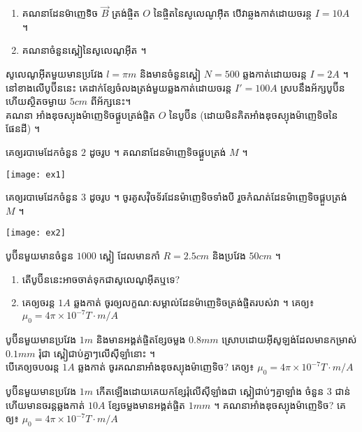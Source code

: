 \documentclass[12pt, a4paper]{article}
\begin{document}
\begin{enumerate}[m]
\begin{minipage}{0.60\textwidth}
	\begin{enumerate}[k]
		\item គណនាដែនម៉ាញេទិច $\vec{B}$ ត្រង់ផ្ចិត $O$ នៃផ្ចិតនៃសូលេណូអ៊ីត បើវាឆ្លងកាត់ដោយចរន្ត $I=10A$ ។
		\item គណនាចំនួនស្ពៀនៃសូលេណូអ៊ីត ។
	\end{enumerate}
	\end{minipage}
	\item សូលេណូអ៊ីតមួយមានប្រវែង $l=\pi m$ និងមានចំនួនស្ពៀ $N=500$ ឆ្លងកាត់ដោយចរន្ត $I=2A$ ។ នៅខាងលើបូប៊ីននេះ គេដាក់ខ្សែចំលងត្រង់មួយឆ្លងកាត់ដោយចរន្ត $I'=100A$ ស្របនឹងអ័ក្សបូប៊ីន ហើយស្ថិតចម្ងាយ $5cm$ ពីអ័ក្សនេះ។ \\
	គណនា អាំងឌុចស្យុងម៉ាញេទិចផ្គួបត្រង់ផ្ចិត $O$ នៃបូប៊ីន (ដោយមិនគិតអាំងឌុចស្យុងម៉ាញេទិចនៃផែនដី) ។\\
	\begin{minipage}{0.60\textwidth}
		\item គេឲ្យរបាមេដែកចំនួន $2$ ដូចរូប ។ គណនាដែនម៉ាញេទិចផ្គួបត្រង់
		$M$ ។
	\end{minipage}
	\begin{minipage}{0.40\textwidth}
		\texttt{[image: ex1]}
	\end{minipage}
	\begin{minipage}{0.60\textwidth}
		\item គេឲ្យរបាមេដែកចំនួន $3$ ដូចរូប ។ ចូរគូសវ៉ិចទ័រដែនម៉ាញេទិចទាំងបី រួចកំណត់ដែនម៉ាញេទិចផ្គួបត្រង់
		$M$ ។
	\end{minipage}
	\begin{minipage}{0.40\textwidth}
		\texttt{[image: ex2]}
	\end{minipage}
	\item បូប៊ីនមួយមានចំនួន $1000$ ស្ពៀ ដែលមានកាំ $R=2.5cm$ និងប្រវែង $50cm$ ។
	\begin{enumerate}[k]
		\item តើបូប៊ីននេះអាចចាត់ទុកជាសូលេណូអ៊ីតឬទេ?
		\item គេឲ្យចរន្ត $1A$ ឆ្លងកាត់ ចូរឲ្យលក្ខណៈសម្គាល់ដែនម៉ាញេទិចត្រង់ផ្ចិតរបស់វា ។ គេឲ្យ៖ $\mu_0=4\pi\times10^{-7}T\cdot m/A$
	\end{enumerate}
	\item បូប៊ីនមួយមានប្រវែង $1m$ និងមានអង្គត់ផ្ចិតខ្សែចម្លង $0.8mm$ ស្រោបដោយអ៊ីសូឡង់ដែលមានកម្រាស់ $0.1mm$ រុំជា ស្ពៀជាប់គ្នាៗលើស៊ីឡាំនោះ ។\\
	បើគេឲ្យចបឲរន្ត $1A$ ឆ្លងកាត់ ចូរគណនាអាំងឌុចស្យុងម៉ាញេទិច? គេឲ្យ៖ $\mu_0=4\pi\times10^{-7}T\cdot m/A$
	\item បូប៊ីនមួយមានប្រវែង $1m$  កើតឡើងដោយគេយកខ្សែរុំលើស៊ីឡាំងជា ស្ពៀជាប់ៗគ្នាឡាំង ចំនួន $3$ ជាន់ ហើយមានចរន្តឆ្លងកាត់ $10A$ ខ្សែចម្លងមានអង្គត់ផ្ចិត $1mm$ ។ គណនាអាំងឌុចស្យុងម៉ាញេទិច? គេឲ្យ៖ $\mu_0=4\pi\times10^{-7}T\cdot m/A$

\end{enumerate}
\end{document}
